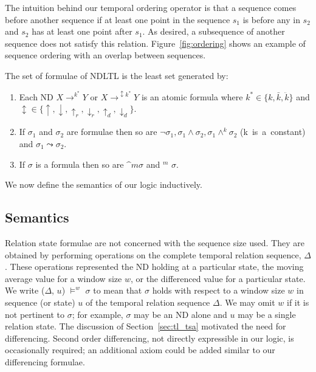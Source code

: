 The intuition behind our temporal ordering operator is that a sequence
comes before another sequence if at least one point in the sequence
$s_1$ is
before any in $s_2$ and $s_2$ has at least one point after $s_1$. As
desired, a subsequence of another sequence does not satisfy this
relation. Figure~\ref{fig:ordering} shows an example of sequence
ordering with an overlap between sequences.


The set of formulae of NDLTL is the
least set generated by:
\begin{enumerate}
\item Each ND $X \to^{{k}^\ast} Y$ or $X \to^{\updownarrow
{k}^\ast} Y$ is an atomic formula where ${k}^\ast \in \{ k,
\bar{{k}}, \ddot{{k}} \}$
  and $\updownarrow  \in \{ \uparrow,
\downarrow, \uparrow_r,\downarrow_r,\uparrow_d,\downarrow_d \}$.
\item If $\sigma_1$ and $\sigma_2$ are formulae then so are $\neg \sigma_1,
\sigma_1 \wedge \sigma_2, \sigma_1 \wedge^k \sigma_2$ (\mbox{k is a
constant}) and $\sigma_1 \leadsto \sigma_2$. 
\item If $\sigma$ is a formula then so are $\bm^m \sigma$ and  \diam$^m$ 
$\sigma$.
\end{enumerate}

We now define the semantics of our logic inductively.

\subsection{Semantics}\label{subsec:tl_semantics}
Relation state formulae are not concerned with the sequence size
used. They are obtained by performing operations on the complete
temporal relation sequence, $\Delta$. These operations represented the
ND holding at a particular state, the moving average value for a
window size $w$, or the differenced value for a particular state. We
write ($\Delta$, $u$) $\models^w$ $\sigma$ to mean that $\sigma$ holds
with respect to a window size $w$ in sequence (or state) $u$ of the
temporal relation sequence $\Delta$. We may omit $w$ if it is not
pertinent to $\sigma$; for example, $\sigma$ may be an ND alone and
$u$ may be a single relation state. The discussion of
Section~\ref{sec:tl_tsa} motivated the need for differencing. Second
order differencing, not directly expressible in our logic, is
occasionally required; an additional axiom could be added similar to
our differencing formulae.


